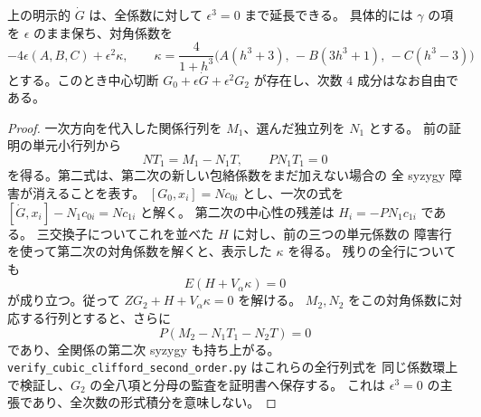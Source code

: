 \begin{corollary}[指定方向の二次障害の消滅]
\label{cor:clifford-transverse-second}
上の明示的 $\dot G$ は、全係数に対して $\epsilon^3=0$ まで延長できる。
具体的には $\gamma$ の項を $\epsilon$ のまま保ち、対角係数を
\[
 -4\epsilon(A,B,C)+\epsilon^2\kappa,
 \qquad
 \kappa=\frac4{1+h^3}
 \bigl(A(h^3+3),\,-B(3h^3+1),\,-C(h^3-3)\bigr)
\]
とする。このとき中心切断
$G_0+\epsilon\dot G+\epsilon^2G_2$ が存在し、次数 $4$ 成分はなお自由である。
\end{corollary}
\begin{proof}
一次方向を代入した関係行列を $M_1$、選んだ独立列を $N_1$ とする。
前の証明の単元小行列から
\[
 NT_1=M_1-N_1T,\qquad PN_1T_1=0
\]
を得る。第二式は、第二次の新しい包絡係数をまだ加えない場合の
全 syzygy 障害が消えることを表す。
$[G_0,x_i]=Nc_{0i}$ とし、一次の式を
$[\dot G,x_i]-N_1c_{0i}=Nc_{1i}$ と解く。
第二次の中心性の残差は $H_i=-PN_1c_{1i}$ である。
三交換子についてこれを並べた $H$ に対し、前の三つの単元係数の
障害行を使って第二次の対角係数を解くと、表示した $\kappa$ を得る。
残りの全行についても
\[
 E(H+V_\alpha\kappa)=0
\]
が成り立つ。従って $ZG_2+H+V_\alpha\kappa=0$ を解ける。
$M_2,N_2$ をこの対角係数に対応する行列とすると、さらに
\[
 P(M_2-N_1T_1-N_2T)=0
\]
であり、全関係の第二次 syzygy も持ち上がる。
\texttt{verify\_cubic\_clifford\_second\_order.py} はこれらの全行列式を
同じ係数環上で検証し、$G_2$ の全八項と分母の監査を証明書へ保存する。
これは $\epsilon^3=0$ の主張であり、全次数の形式積分を意味しない。
\end{proof}
